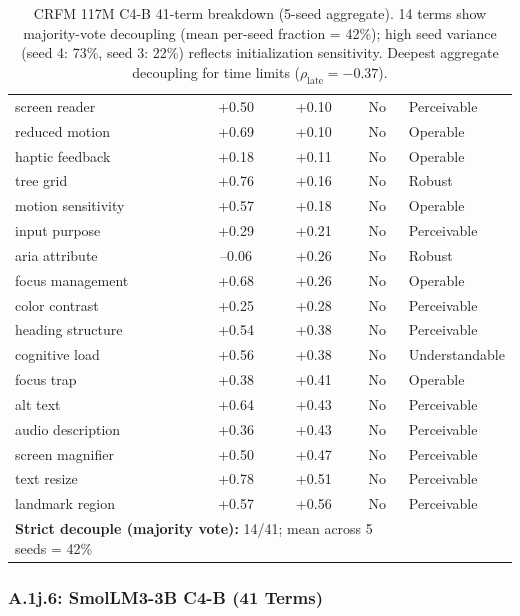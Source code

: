 \documentclass[10pt]{article} %
\begin{document}
\begin{table}[H]
\begin{tabular}{|l|c|c|c|l|}
screen reader & +0.50 & +0.10 & No & Perceivable \\
reduced motion & +0.69 & +0.10 & No & Operable \\
haptic feedback & +0.18 & +0.11 & No & Operable \\
tree grid & +0.76 & +0.16 & No & Robust \\
motion sensitivity & +0.57 & +0.18 & No & Operable \\
input purpose & +0.29 & +0.21 & No & Perceivable \\
aria attribute & --0.06 & +0.26 & No & Robust \\
focus management & +0.68 & +0.26 & No & Operable \\
color contrast & +0.25 & +0.28 & No & Perceivable \\
heading structure & +0.54 & +0.38 & No & Perceivable \\
cognitive load & +0.56 & +0.38 & No & Understandable \\
focus trap & +0.38 & +0.41 & No & Operable \\
alt text & +0.64 & +0.43 & No & Perceivable \\
audio description & +0.36 & +0.43 & No & Perceivable \\
screen magnifier & +0.50 & +0.47 & No & Perceivable \\
text resize & +0.78 & +0.51 & No & Perceivable \\
landmark region & +0.57 & +0.56 & No & Perceivable \\
\hline
\multicolumn{4}{|l|}{\textbf{Strict decouple (majority vote):} 14/41; mean across 5 seeds = 42\%} \\
\hline
\end{tabular}
\caption{CRFM 117M C4-B 41-term breakdown (5-seed aggregate). 14 terms show majority-vote decoupling (mean per-seed fraction = 42\%); high seed variance (seed 4: 73\%, seed 3: 22\%) reflects initialization sensitivity. Deepest aggregate decoupling for time limits ($\rho_\text{late}=-0.37$).}
\end{table}

\subsubsection*{A.1j.6: SmolLM3-3B C4-B (41 Terms)}
\end{document}
